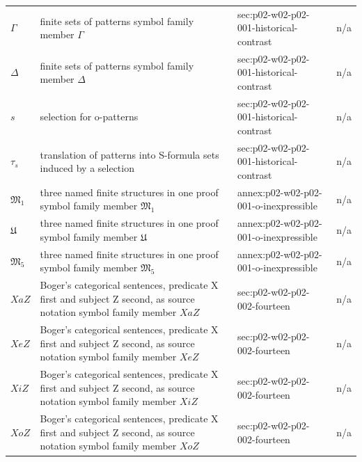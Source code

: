 \begin{longtable}{@{}p{}p{}p{}p{}@{}}
\(\Gamma\) & finite sets of patterns symbol family member \(\Gamma\) & sec:\allowbreak{}p02-\allowbreak{}w02-\allowbreak{}p02-\allowbreak{}001-\allowbreak{}historical-\allowbreak{}contrast & n/a \\
\(\Delta\) & finite sets of patterns symbol family member \(\Delta\) & sec:\allowbreak{}p02-\allowbreak{}w02-\allowbreak{}p02-\allowbreak{}001-\allowbreak{}historical-\allowbreak{}contrast & n/a \\
\(s\) & selection for o-patterns & sec:\allowbreak{}p02-\allowbreak{}w02-\allowbreak{}p02-\allowbreak{}001-\allowbreak{}historical-\allowbreak{}contrast & n/a \\
\(\tau_s\) & translation of patterns into S-formula sets induced by a selection & sec:\allowbreak{}p02-\allowbreak{}w02-\allowbreak{}p02-\allowbreak{}001-\allowbreak{}historical-\allowbreak{}contrast & n/a \\
\(\mathfrak M_1\) & three named finite structures in one proof symbol family member \(\mathfrak M_1\) & annex:\allowbreak{}p02-\allowbreak{}w02-\allowbreak{}p02-\allowbreak{}001-\allowbreak{}o-\allowbreak{}inexpressible & n/a \\
\(\mathfrak U\) & three named finite structures in one proof symbol family member \(\mathfrak U\) & annex:\allowbreak{}p02-\allowbreak{}w02-\allowbreak{}p02-\allowbreak{}001-\allowbreak{}o-\allowbreak{}inexpressible & n/a \\
\(\mathfrak M_5\) & three named finite structures in one proof symbol family member \(\mathfrak M_5\) & annex:\allowbreak{}p02-\allowbreak{}w02-\allowbreak{}p02-\allowbreak{}001-\allowbreak{}o-\allowbreak{}inexpressible & n/a \\
\(XaZ\) & Boger's categorical sentences, predicate X first and subject Z second, as source notation symbol family member \(XaZ\) & sec:\allowbreak{}p02-\allowbreak{}w02-\allowbreak{}p02-\allowbreak{}002-\allowbreak{}fourteen & n/a \\
\(XeZ\) & Boger's categorical sentences, predicate X first and subject Z second, as source notation symbol family member \(XeZ\) & sec:\allowbreak{}p02-\allowbreak{}w02-\allowbreak{}p02-\allowbreak{}002-\allowbreak{}fourteen & n/a \\
\(XiZ\) & Boger's categorical sentences, predicate X first and subject Z second, as source notation symbol family member \(XiZ\) & sec:\allowbreak{}p02-\allowbreak{}w02-\allowbreak{}p02-\allowbreak{}002-\allowbreak{}fourteen & n/a \\
\(XoZ\) & Boger's categorical sentences, predicate X first and subject Z second, as source notation symbol family member \(XoZ\) & sec:\allowbreak{}p02-\allowbreak{}w02-\allowbreak{}p02-\allowbreak{}002-\allowbreak{}fourteen & n/a \\

\end{longtable}
